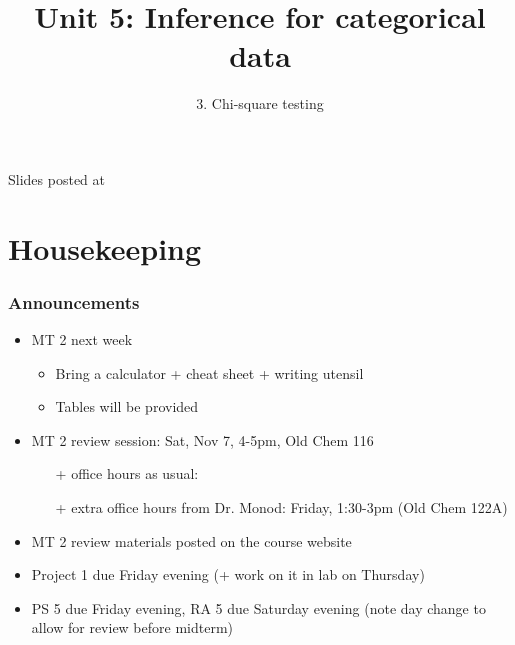 \documentclass[slidestop,compress,mathserif,12pt,t,professionalfonts,xcolor=table]{beamer}
\title{Unit 5: Inference for categorical data}
\subtitle{3. Chi-square testing}
\author{\CourseName}
\date{}
\institute{\InstituteName}
\begin{document}



\begin{frame}[plain]

\titlepage

\vfill

{\scriptsize {} \hfill Slides posted at  \webURL{\CourseSite}}

\addtocounter{framenumber}{-1} 

\end{frame}


\section{Housekeeping}


\begin{frame}
\frametitle{Announcements}

\begin{itemize}

\item MT 2 next week
\begin{itemize}
\item Bring a calculator + cheat sheet + writing utensil
\item Tables will be provided
\end{itemize}

\item MT 2 review session: Sat, Nov 7, 4-5pm, Old Chem 116
\begin{itemize}
\item[+] office hours as usual: 
\item[+] extra office hours from Dr. Monod: Friday, 1:30-3pm (Old Chem 122A)
\end{itemize}

\item MT 2 review materials posted on the course website

\item Project 1 due Friday evening (+ work on it in lab on Thursday)

\item PS 5 due Friday evening, RA 5 due Saturday evening (note day change to allow for review before midterm)

\end{itemize}

\end{frame}
\end{document}
